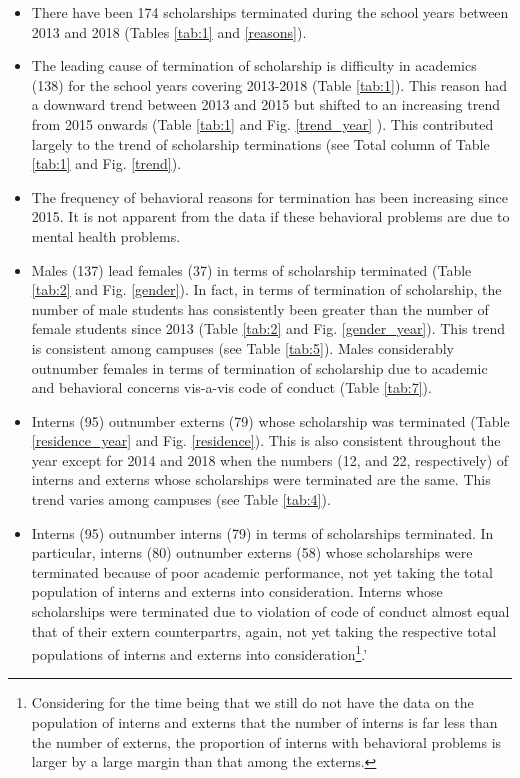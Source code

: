 \documentclass[a4paper]{article}
\providecommand{\tightlist}{%
  \setlength{\itemsep}{0pt}\setlength{\parskip}{0pt}}
\let\rmarkdownfootnote\footnote%
\def\footnote{\protect\rmarkdownfootnote}
\begin{document}
\begin{itemize}
\tightlist
\item
  There have been 174 scholarships terminated during the school years
  between 2013 and 2018 (Tables \ref{tab:1} and \ref{reasons}).
\item
  The leading cause of termination of scholarship is difficulty in
  academics (138) for the school years covering 2013-2018 (Table
  \ref{tab:1}). This reason had a downward trend between 2013 and 2015
  but shifted to an increasing trend from 2015 onwards (Table
  \ref{tab:1} and Fig. \ref{trend_year} ). This contributed largely to
  the trend of scholarship terminations (see Total column of Table
  \ref{tab:1} and Fig. \ref{trend}).
\item
  The frequency of behavioral reasons for termination has been
  increasing since 2015. It is not apparent from the data if these
  behavioral problems are due to mental health problems.
\item
  Males (137) lead females (37) in terms of scholarship terminated
  (Table \ref{tab:2} and Fig. \ref{gender}). In fact, in terms of
  termination of scholarship, the number of male students has
  consistently been greater than the number of female students since
  2013 (Table \ref{tab:2} and Fig. \ref{gender_year}). This trend is
  consistent among campuses (see Table \ref{tab:5}). Males considerably
  outnumber females in terms of termination of scholarship due to
  academic and behavioral concerns vis-a-vis code of conduct (Table
  \ref{tab:7}).
\item
  Interns (95) outnumber externs (79) whose scholarship was terminated
  (Table \ref{residence_year} and Fig. \ref{residence}). This is also
  consistent throughout the year except for 2014 and 2018 when the
  numbers (12, and 22, respectively) of interns and externs whose
  scholarships were terminated are the same. This trend varies among
  campuses (see Table \ref{tab:4}).
\item
  Interns (95) outnumber interns (79) in terms of scholarships
  terminated. In particular, interns (80) outnumber externs (58) whose
  scholarships were terminated because of poor academic performance, not
  yet taking the total population of interns and externs into
  consideration. Interns whose scholarships were terminated due to
  violation of code of conduct almost equal that of their extern
  counterpartrs, again, not yet taking the respective total populations
  of interns and externs into consideration\footnote{Considering for the
    time being that we still do not have the data on the population of
    interns and externs that the number of interns is far less than the
    number of externs, the proportion of interns with behavioral
    problems is larger by a large margin than that among the externs.}.'
\end{itemize}
\end{document}
